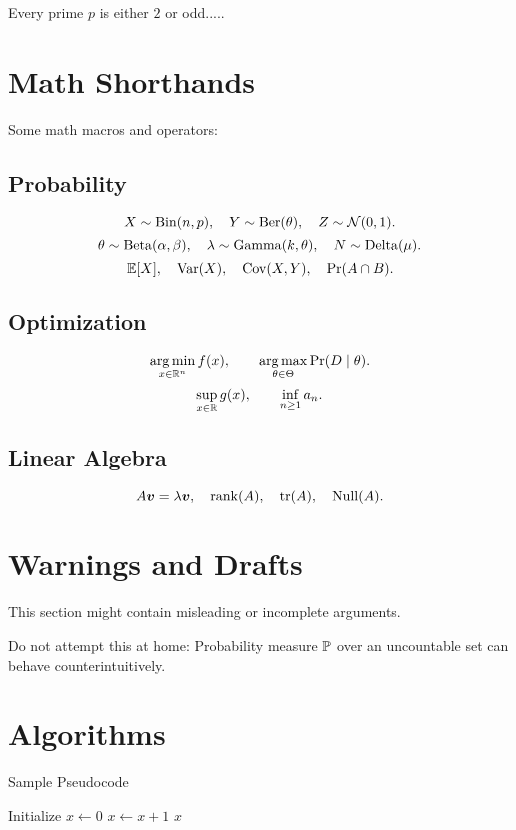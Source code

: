 \documentclass[11pt]{article}
\begin{document}
\begin{corollary}
Every prime $p$ is either $2$ or odd.....
\end{corollary}

\section{Math Shorthands}
Some math macros and operators:

\subsection{Probability}
\[
X \sim \operatorname{Bin}(n,p), \quad Y \sim \operatorname{Ber}(\theta), \quad Z \sim \mathcal{N}(0,1).
\]
\[
\theta \sim \operatorname{Beta}(\alpha,\beta), \quad 
\lambda \sim \operatorname{Gamma}(k,\theta), \quad 
N \sim \operatorname{Delta}(\mu).
\]
\[
\mathbb{E}[X], \quad \operatorname{Var}(X), \quad \operatorname{Cov}(X,Y), \quad \Pr(A \cap B).
\]

\subsection{Optimization}
\[
\operatorname*{arg\,min}_{x \in \mathbb{R}^n} f(x), 
\qquad 
\operatorname*{arg\,max}_{\theta \in \Theta} \Pr(D \mid \theta).
\]
\[
\sup_{x \in \mathbb{R}} g(x), 
\qquad 
\inf_{n \geq 1} a_n.
\]

\subsection{Linear Algebra}
\[
A \bm{v} = \lambda \bm{v}, 
\quad \operatorname{rank}(A), 
\quad \operatorname{tr}(A), 
\quad \operatorname{Null}(A).
\]

\section{Warnings and Drafts}
\begin{danger}
This section might contain misleading or incomplete arguments.
\end{danger}

\begin{ddanger}
Do not attempt this at home: Probability measure $\mathbb{P}$ over an uncountable set
can behave counterintuitively.
\end{ddanger}

\DRAFT %

\section{Algorithms}
\begin{algorithm}
\caption{Sample Pseudocode}
\begin{algorithmic}[1]
\State Initialize $x \gets 0$
  \State $x \gets x+1$
\EndWhile
\State \Return $x$
\end{algorithmic}
\end{algorithm}
\end{document}
